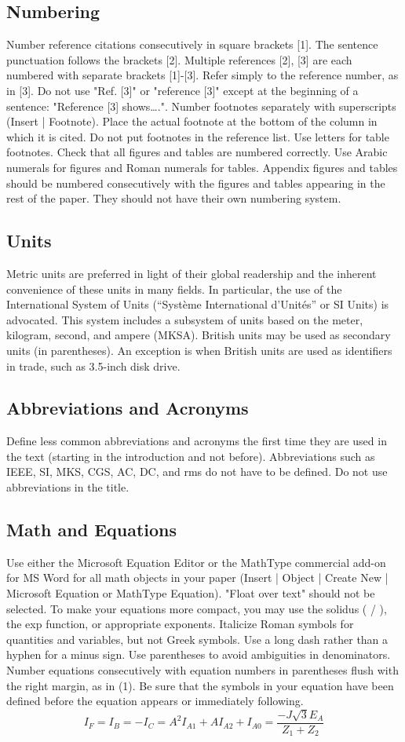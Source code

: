\documentclass[a4paper]{IEEEtran}
\begin{document}
\subsection{Numbering}
Number reference citations consecutively in square brackets [1]. The sentence punctuation follows the brackets [2]. Multiple references [2], [3] are each numbered with separate brackets [1]-[3]. Refer simply to the reference number, as in [3]. Do not use "Ref. [3]" or "reference [3]" except at the beginning of a sentence: "Reference [3] shows….".
Number footnotes separately with superscripts (Insert | Footnote). Place the actual footnote at the bottom of the column in which it is cited. Do not put footnotes in the reference list. Use letters for table footnotes.
Check that all figures and tables are numbered correctly. Use Arabic numerals for figures and Roman numerals for tables.
Appendix figures and tables should be numbered consecutively with the figures and tables appearing in the rest of the paper. They should not have their own numbering system.
\subsection{Units}
Metric units are preferred in light of their global readership and the inherent convenience of these units in many fields. In particular, the use of the International System of Units (“Système International d'Unités” or SI Units) is advocated. This system includes a subsystem of units based on the meter, kilogram, second, and ampere (MKSA). British units may be used as secondary units (in parentheses). An exception is when British units are used as identifiers in trade, such as 3.5-inch disk drive.
\subsection{Abbreviations and Acronyms }
Define less common abbreviations and acronyms the first time they are used in the text (starting in the introduction and not before). Abbreviations such as IEEE, SI, MKS, CGS, AC, DC, and rms do not have to be defined. Do not use abbreviations in the title.
\subsection{Math and Equations}
Use either the Microsoft Equation Editor or the MathType commercial add-on for MS Word for all math objects in your paper (Insert | Object | Create New | Microsoft Equation or MathType Equation). "Float over text" should not be selected.
To make your equations more compact, you may use the solidus ( / ), the exp function, or appropriate exponents. Italicize Roman symbols for quantities and variables, but not Greek symbols. Use a long dash rather than a hyphen for a minus sign. Use parentheses to avoid ambiguities in denominators.
Number equations consecutively with equation numbers in parentheses flush with the right margin, as in (1). Be sure that the symbols in your equation have been defined before the equation appears or immediately following.
\begin{equation}
I_F = I_B = -I_C = A^{2}I_{A1}+AI_{A2}+I_{A0}=\frac{-J \sqrt{3}E_A}{Z_1+Z_2}
\end{equation}
\end{document}
